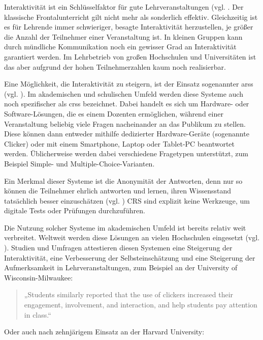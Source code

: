 Interaktivität ist ein Schlüsselfaktor für gute Lehrveranstaltungen (vgl. \cite[S. 1]{art:ieee}. Der klassische Frontalunterricht gilt nicht mehr als sonderlich effektiv. Gleichzeitig ist es für Lehrende immer schwieriger, besagte Interaktivität herzustellen, je größer die Anzahl der Teilnehmer einer Veranstaltung ist. In kleinen Gruppen kann durch mündliche Kommunikation noch ein gewisser Grad an Interaktivität garantiert werden. Im Lehrbetrieb von großen Hochschulen und Universitäten ist das aber aufgrund der hohen Teilnehmerzahlen kaum noch realisierbar.


Eine Möglichkeit, die Interaktivität zu steigern, ist der Einsatz sogenannter \acp{ars} (vgl. \cite[S. 5]{art:ieee}). Im akademischen und schulischen Umfeld werden diese Systeme auch noch spezifischer als \acp{crs} bezeichnet. Dabei handelt es sich um Hardware- oder Software-Lösungen, die es einem Dozenten ermöglichen, während einer Veranstaltung beliebig viele Fragen nacheinander an das Publikum zu stellen. Diese können dann entweder mithilfe dedizierter Hardware-Geräte (sogenannte Clicker) oder mit einem Smartphone, Laptop oder Tablet-PC beantwortet werden. Üblicherweise werden dabei verschiedene Fragetypen unterstützt, zum Beispiel Simple- und Multiple-Choice-Varianten.

Ein Merkmal dieser Systeme ist die Anonymität der Antworten, denn nur so können die Teilnehmer ehrlich antworten und lernen, ihren Wissensstand tatsächlich besser einzuschätzen (vgl. \cite[S. 106]{art:crs_literature_review}) CRS sind explizit keine Werkzeuge, um digitale Tests oder Prüfungen durchzuführen.

Die Nutzung solcher Systeme im akademischen Umfeld ist bereits relativ weit verbreitet. Weltweit werden diese Lösungen an vielen Hochschulen eingesetzt (vgl. \cite{web:elanwiki}). Studien und Umfragen attestieren diesen Systemen eine Steigerung der Interaktivität, eine Verbesserung der Selbsteinschätzung und eine Steigerung der Aufmerksamkeit in Lehrveranstaltungen, zum Beispiel an der University of Wisconsin-Milwaukee\cite[S. 5]{paper:wisconsin_clicker}:

\begin{quote}
„Students similarly reported that the use of clickers increased their engagement, involvement, and interaction, and help students pay attention in class.“
\end{quote}

Oder auch nach zehnjärigem Einsatz an der Harvard University\cite[S. 6]{paper:harvard_tenyears}:


